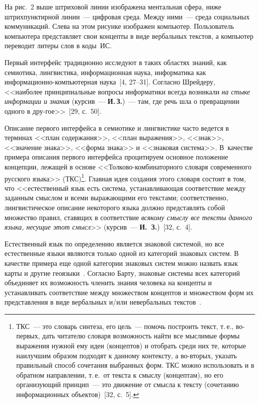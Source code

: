 \begin{multicols}{2}
   На рис.~2 выше штриховой линии изображена ментальная сфера, ниже 
   штрихпунктирной линии~--- цифровая среда. Между ними~--- среда социальных 
коммуникаций. Слева на этом рисунке изображен компьютер. Пользователь компьютера 
представляет свои концепты в виде вербальных текс\-тов, а компьютер переводит литеры слов 
в коды~ИС.

   
   Первый интерфейс традиционно исследуют в таких областях знаний, как семиотика, 
лингвистика, информационная наука, информатика как информационно-компьютерная 
наука~[4, 27--31]. Согласно Шрейдеру, <<наиболее 
принципиальные вопросы информатики всегда возникали \textit{на стыке информации и 
знания} (курсив~--- \textbf{И.\,З.})~--- там, где речь шла о превращении одного в 
дру-\linebreak гое>>~[29, с.~50].
   
   Описание первого интерфейса в семиотике и лингвистике часто ведется в терминах 
<<план содержания>>, <<план выражения>>, <<знак>>, <<значение %
 знака>>, <<форма 
знака>> и <<знаковая система>>. В~качестве примера описания первого интерфейса\linebreak 
процитируем основное положение концепции, лежащей в основе 
   <<Толково-комбинаторного словаря современного русского языка>> 
(ТКС)\footnote{ТКС~--- это словарь синтеза, его цель~--- помочь построить текст, т.\,е., во-первых, дать 
читателю словаря возможность найти все мыслимые формы выражения нужной ему идеи (концептов) и 
отобрать среди них те, которые наилучшим образом подходят к данному контексту, а во-вторых, указать 
правильный способ сочетания выбранных форм. ТКС можно использовать и в обратном направлении, т.\,е.\ 
от текста к смыслу (концептам), но его организующий принцип~--- это движение от смысла к тексту 
(сочетанию информационных объектов)~[32, с.~5].}. Главная идея %
 создания этого словаря 
состоит в том, что <<естест\-венный язык есть система, уста\-нав\-ли\-ва\-ющая соответствие между 
заданным смыслом и всеми выражающими его текстами; соответственно, %
 лингвистическое 
описание некоторого языка должно представлять собой множество правил, ставящих в 
соответствие \textit{всякому смыслу все тексты данного языка, несущие этот смысл}>> 
(курсив~--- \textbf{И.~З.})~[32, с.~4].
{

}
   
   Естественный язык по определению является знаковой системой, но все естественные 
языки являются только одной из категорий знаковых сис\-тем. В качестве примера еще одной 
категории знаковых систем можно назвать язык карты и другие геоязыки~\cite{33zat}. 
Согласно Барту, знаковые системы всех категорий объединяет их возможность членить 
знания человека на концепты и устанавливать соответствие между множеством концептов и 
множеством форм их представления в виде вербальных и/или невербальных 
текстов~\cite{34zat}.
   

\end{multicols}
